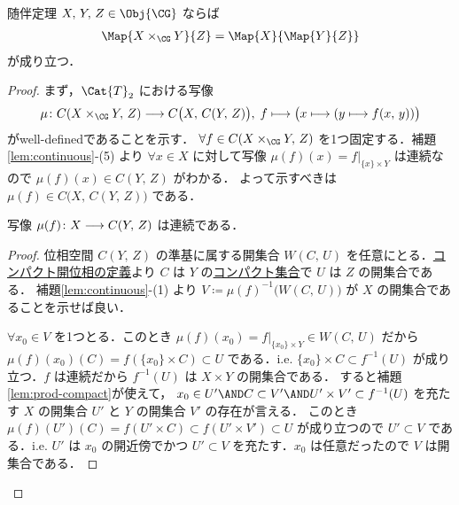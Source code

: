 \documentclass[algtopo_main]{subfiles}
\begin{document}
\begin{mytheo}[label=thm:CG-adjoint]{随伴定理}
    $X,\, Y,\, Z \in \Obj{\CG}$ ならば
    \begin{align}
        \Map{X \times_{\CG} Y}{Z} = \Map{X}{\Map{Y}{Z}}
    \end{align}
    が成り立つ．
\end{mytheo}

\begin{proof}

    まず，$\Cat{T}_2$ における写像%
    \begin{align}
        \label{isom:CG-adjoint}
        \mu \colon C(X \times_{\CG} Y,\, Z) \lto C \bigl( X,\, C(Y,\, Z) \bigr),\; f \lmto \bigl( x \lmto (y \lmto f(x,\, y)) \bigr) 
    \end{align}
    がwell-definedであることを示す．
    $\forall f \in C(X \times_{\CG} Y,\, Z)$ を1つ固定する．補題\ref{lem:continuous}-(5) より $\forall x \in X$ に対して写像 $\mu(f)(x) = f|_{\{x\} \times Y}$ は連続なので $\mu(f)(x) \in C(Y,\, Z)$ がわかる．
    よって示すべきは $\mu(f) \in  C \bigl( X,\, C(Y,\, Z) \bigr)$ である．
    \hrulefill
    \begin{mylem}[label=lem:thm:adjoint]{}
        写像 $\mu(f) \colon X \longrightarrow C(Y,\, Z)$ は連続である．
    \end{mylem}

    \begin{proof}
        位相空間 $C(Y,\, Z)$ の準基に属する開集合 $W(C,\, U)$ を任意にとる．\hyperref[def:compact-open]{コンパクト開位相の定義}より $C$ は $Y$ の\hyperref[def:compact]{コンパクト集合}で $U$ は $Z$ の開集合である．
        補題\ref{lem:continuous}-(1) より $V \coloneqq \mu(f)^{-1} \bigl( W(C,\, U) \bigr)$ が $X$ の開集合であることを示せば良い．

        $\forall x_0 \in V$ を1つとる．このとき $\mu(f)(x_0) = f|_{\{x_0\} \times Y} \in W(C,\, U)$ だから $\mu(f)(x_0)(C) = f(\{x_0\} \times C) \subset U$ である．i.e. $\{x_0\} \times C \subset f^{-1}(U)$ が成り立つ．$f$ は連続だから $f^{-1}(U)$ は $X \times Y$ の開集合である．
        すると補題\ref{lem:prod-compact}が使えて，
        $x_0 \in U' \AND C \subset V' \AND U' \times V' \subset f^{-1}(U)$ を充たす $X$ の開集合 $U'$ と $Y$ の開集合 $V'$ の存在が言える．
        このとき $\mu(f)(U')(C) = f(U' \times C) \subset f(U' \times V') \subset U$ が成り立つので $U' \subset V$ である．i.e. $U'$ は $x_0$ の開近傍でかつ $U' \subset V$ を充たす．$x_0$ は任意だったので $V$ は開集合である．
    \end{proof}
    

\end{proof}
\end{document}
